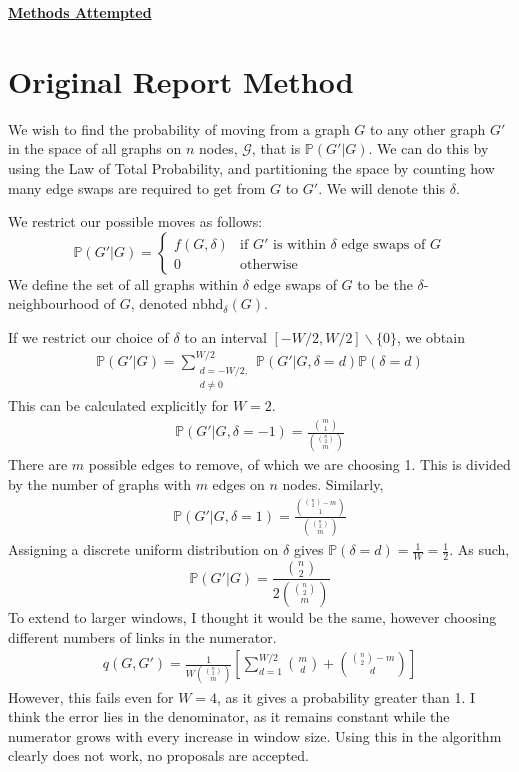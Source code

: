 \documentclass[10pt,a4paper]{article}
\begin{document}
	     \begin{center}
	 	\Large{\underline{\bf Methods Attempted}}
	 \end{center}
 
 \section{Original Report Method}
 We wish to find the probability of moving from a graph \(G\) to any other graph \(G'\) in the space of all graphs on \(n\) nodes, \(\mathcal{G}\), that is \(\mathbb{P}(G'|G)\). We can do this by using the Law of Total Probability, and partitioning the space by counting how many edge swaps are required to get from \(G\) to \(G'\). We will denote this \(\delta\).\par 
 We restrict our possible moves as follows:
 \[\mathbb{P}(G'|G) = \begin{cases}
 f(G,\delta) & \text{if }G' \text{ is within } \delta \text{ edge swaps of }G\\
 0
 & \text{otherwise}
 \end{cases}\]
 We define the set of all graphs within \(\delta\) edge swaps of \(G\) to be the \(\delta\)-neighbourhood of \(G\), denoted \(\mathrm{nbhd}_{\delta}(G)\). \par 
 If we restrict our choice of \(\delta\) to an interval \(\left[ -W/2,W/2\right]\backslash\{0\}\), we obtain
 \begin{align*}
 \mathbb{P}(G'|G)= \sum_{\substack{d=-W/2,\\ d\neq0}}^{W/2}\mathbb{P}(G'|G,\delta=d)\mathbb{P}(\delta=d)
 \end{align*}
 This can be calculated explicitly for \(W=2\).
 \begin{align*}
 \mathbb{P}(G'|G,\delta=-1) = \frac{\binom{m}{1}}{\binom{\binom{n}{2}}{m}}
 \end{align*}
 There are \(m\) possible edges to remove, of which we are choosing 1. This is divided by the number of graphs with \(m\) edges on \(n\) nodes. Similarly, 
  \begin{align*}
 \mathbb{P}(G'|G,\delta=1) = \frac{\binom{\binom{n}{2}-m}{1}}{\binom{\binom{n}{2}}{m}}
 \end{align*}
 Assigning a discrete uniform distribution on \(\delta\) gives \(\mathbb{P}(\delta=d)=\frac{1}{W}=\frac{1}{2}\). As such,
 \[\mathbb{P}(G'|G) = \frac{\binom{n}{2}}{2\binom{\binom{n}{2}}{m}}\]
 To extend to larger windows, I thought it would be the same, however choosing different numbers of links in the numerator.
 \begin{align*}
 q(G,G')=\frac{1}{W\binom{\binom{n}{2}}{m}}\left[\sum_{d=1}^{W/2} \binom{m}{d}+\binom{\binom{n}{2}-m}{d}\right]
 \end{align*} However, this fails even for \(W=4\), as it gives a probability greater than 1. I think the error lies in the denominator, as it remains constant while the numerator grows with every increase in window size. Using this in the algorithm clearly does not work, no proposals are accepted.
\end{document}

